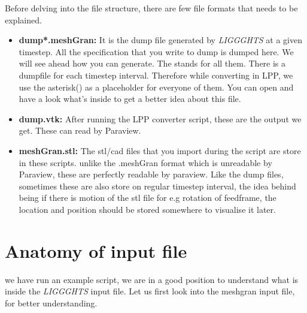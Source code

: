 \documentclass{tufte-book} %
\newcommand{\Li}{\textit{LIGGGHTS}\xspace}
\begin{document}
Before delving into the file structure, there are few file formats that needs to be explained.
\begin{itemize}
\item \textbf{dump*.meshGran:} It is the dump file generated by \Li at a given timestep. All the specification that you write to dump is dumped here. We will see ahead how you can generate. The \* stands for all them. There is a dumpfile for each timestep interval. Therefore while converting in LPP, we use the asterisk(\*) as a placeholder for everyone of them.  You can open and have a look what's inside to get a better idea about this file.
\item \textbf{dump.vtk:} After running the LPP converter script, these are the output we get. These can read by Paraview. 
\item \textbf{meshGran.stl:} The stl/cad files that you import during the script are store in these scripts. unlike the .meshGran format which is unreadable by Paraview, these are perfectly readable by paraview. Like the dump files, sometimes these are also store on regular timestep interval, the idea behind being if there is motion of the stl file for e.g rotation of feedframe, the location and position should be stored somewhere to visualise it later. 
\end{itemize}
 \section{Anatomy of input file}

 \begin{fullwidth}
    we have run an example script, we are in a good position to understand what is inside the \Li input file.
   Let us first look into the meshgran input file, for better understanding.
 \end{fullwidth}

 
   
 \inputminted{cpp}{in.meshGran}
   
  
\end{document}
